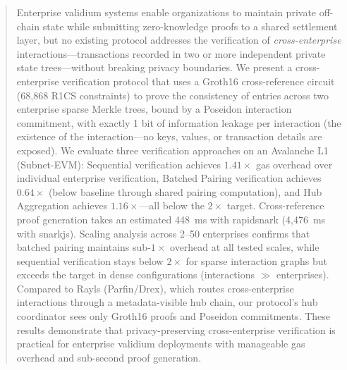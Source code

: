 
\begin{abstract}
Enterprise validium systems enable organizations to maintain private off-chain
state while submitting zero-knowledge proofs to a shared settlement layer, but
no existing protocol addresses the verification of \emph{cross-enterprise}
interactions---transactions recorded in two or more independent private state
trees---without breaking privacy boundaries. We present a cross-enterprise
verification protocol that uses a Groth16 cross-reference circuit (68,868
R1CS constraints) to prove the consistency of entries across two enterprise
sparse Merkle trees, bound by a Poseidon interaction commitment, with exactly
1 bit of information leakage per interaction (the existence of the
interaction---no keys, values, or transaction details are exposed). We
evaluate three verification approaches on an Avalanche L1 (Subnet-EVM):
Sequential verification achieves $1.41\times$ gas overhead over individual
enterprise verification, Batched Pairing verification achieves $0.64\times$
(below baseline through shared pairing computation), and Hub Aggregation
achieves $1.16\times$---all below the $2\times$ target. Cross-reference proof
generation takes an estimated 448~ms with rapidsnark (4,476~ms with snarkjs).
Scaling analysis across 2--50 enterprises confirms that batched pairing
maintains sub-$1\times$ overhead at all tested scales, while sequential
verification stays below $2\times$ for sparse interaction graphs but exceeds
the target in dense configurations (interactions $\gg$ enterprises). Compared
to Rayls (Parfin/Drex), which routes cross-enterprise interactions through a
metadata-visible hub chain, our protocol's hub coordinator sees only Groth16
proofs and Poseidon commitments. These results demonstrate that
privacy-preserving cross-enterprise verification is practical for enterprise
validium deployments with manageable gas overhead and sub-second proof
generation.
\end{abstract}
